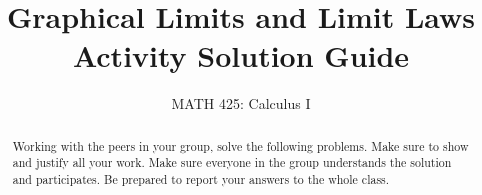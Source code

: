 \documentclass{ximera}
\title{Graphical Limits and Limit Laws Activity Solution Guide}
\author{MATH 425: Calculus I}
\begin{document}
\begin{abstract}
    Working with the peers in your group, solve the following problems. Make sure to show and justify all your work. Make sure everyone in the group understands the solution and participates. Be prepared to report your answers to the whole class. 
\end{abstract}
\maketitle



\end{document}

